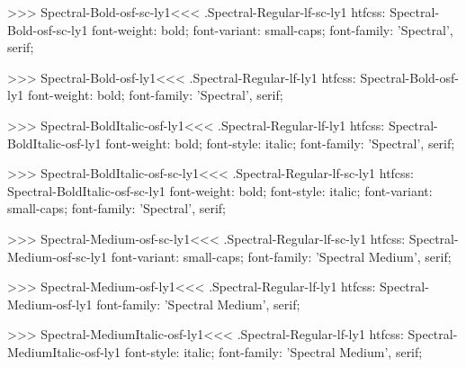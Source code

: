 >>>
\<Spectral-Bold-osf-sc-ly1\><<<
.Spectral-Regular-lf-sc-ly1
htfcss:  Spectral-Bold-osf-sc-ly1  font-weight: bold; font-variant: small-caps; font-family: 'Spectral', serif;

>>>
\<Spectral-Bold-osf-ly1\><<<
.Spectral-Regular-lf-ly1
htfcss:  Spectral-Bold-osf-ly1  font-weight: bold; font-family: 'Spectral', serif;

>>>
\<Spectral-BoldItalic-osf-ly1\><<<
.Spectral-Regular-lf-ly1
htfcss:  Spectral-BoldItalic-osf-ly1  font-weight: bold; font-style: italic; font-family: 'Spectral', serif;

>>>
\<Spectral-BoldItalic-osf-sc-ly1\><<<
.Spectral-Regular-lf-sc-ly1
htfcss:  Spectral-BoldItalic-osf-sc-ly1  font-weight: bold; font-style: italic; font-variant: small-caps; font-family: 'Spectral', serif;

>>>
\<Spectral-Medium-osf-sc-ly1\><<<
.Spectral-Regular-lf-sc-ly1
htfcss:  Spectral-Medium-osf-sc-ly1  font-variant: small-caps; font-family: 'Spectral Medium', serif;

>>>
\<Spectral-Medium-osf-ly1\><<<
.Spectral-Regular-lf-ly1
htfcss:  Spectral-Medium-osf-ly1  font-family: 'Spectral Medium', serif;

>>>
\<Spectral-MediumItalic-osf-ly1\><<<
.Spectral-Regular-lf-ly1
htfcss:  Spectral-MediumItalic-osf-ly1  font-style: italic; font-family: 'Spectral Medium', serif;


